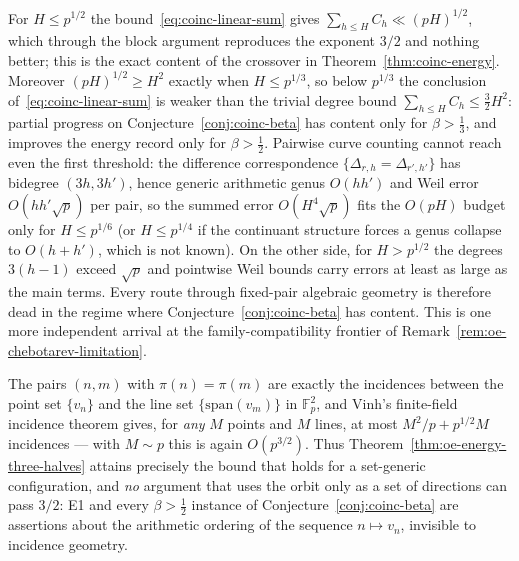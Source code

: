 \begin{remark}
\label{rem:coinc-battle-line}
For $H\le p^{1/2}$ the bound~\eqref{eq:coinc-linear-sum} gives
$\sum_{h\le H}C_h\ll(pH)^{1/2}$, which through the block argument
reproduces the exponent $3/2$ and nothing better; this is the exact
content of the crossover in Theorem~\ref{thm:coinc-energy}.  Moreover
$(pH)^{1/2}\ge H^2$ exactly when $H\le p^{1/3}$, so
below $p^{1/3}$ the conclusion of~\eqref{eq:coinc-linear-sum} is weaker
than the trivial degree bound $\sum_{h\le H}C_h\le\tfrac32H^2$: partial
progress on Conjecture~\ref{conj:coinc-beta} has content only for
$\beta>\tfrac13$, and improves the energy record only for
$\beta>\tfrac12$.  Pairwise curve counting cannot reach even the first
threshold: the difference correspondence
$\{\Delta_{r,h}=\Delta_{r',h'}\}$ has bidegree $(3h,3h')$, hence generic
arithmetic genus $O(hh')$ and Weil error $O(hh'\sqrt p)$ per pair, so the
summed error $O(H^4\sqrt p)$ fits the $O(pH)$ budget only for
$H\le p^{1/6}$ (or $H\le p^{1/4}$ if the continuant structure forces a
genus collapse to $O(h{+}h')$, which is not known).  On the other side,
for $H>p^{1/2}$ the degrees $3(h-1)$ exceed $\sqrt p$ and pointwise Weil
bounds carry errors at least as large as the main terms.  Every route
through fixed-pair algebraic geometry is therefore dead in the regime
where Conjecture~\ref{conj:coinc-beta} has content.  This is one more
independent arrival at the family-compatibility frontier of
Remark~\ref{rem:oe-chebotarev-limitation}.
\end{remark}

\begin{remark}
\label{rem:coinc-vinh}
The pairs $(n,m)$ with $\pi(n)=\pi(m)$ are exactly the incidences between
the point set $\{v_n\}$ and the line set $\{\mathrm{span}(v_m)\}$ in
$\mathbb F_p^2$, and Vinh's finite-field incidence theorem gives, for
\emph{any} $M$ points and $M$ lines, at most $M^2/p+p^{1/2}M$ incidences
--- with $M\sim p$ this is again $O(p^{3/2})$.  Thus
Theorem~\ref{thm:oe-energy-three-halves} attains precisely the bound that
holds for a set-generic configuration, and \emph{no} argument that uses
the orbit only as a set of directions can pass $3/2$: E1 and every
$\beta>\tfrac12$ instance of Conjecture~\ref{conj:coinc-beta} are
assertions about the arithmetic ordering of the sequence
$n\mapsto v_n$, invisible to incidence geometry.
\end{remark}

